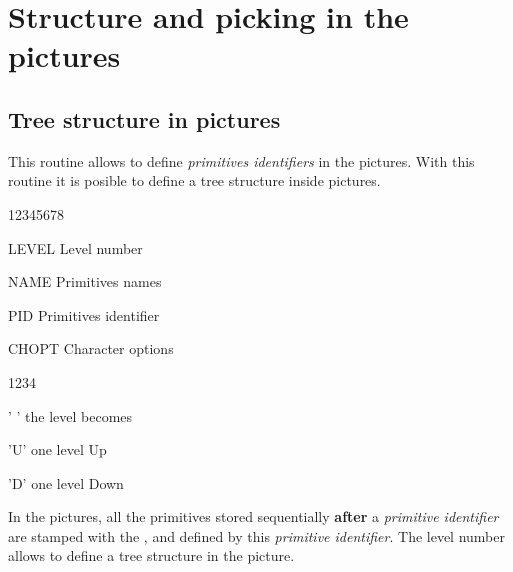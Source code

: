 \chapter{Structure and picking in the \HIGZ{} pictures}
\section{Tree structure in \HIGZ{} pictures}
\Action
This routine allows to define {\it primitives identifiers} in the 
\HIGZ{} pictures. With this routine it is posible to define a tree 
structure inside \HIGZ{} pictures.
\Pdesc
\begin{DLtt}{12345678}
   \item[LEVEL] Level number
   \item[NAME] Primitives names
   \item[PID] Primitives identifier
   \item[CHOPT] Character options
   \begin{DLtt}{1234}
      \item[' '] the level becomes 
      \item['U'] one level Up
      \item['D'] one level Down
   \end{DLtt}
\end{DLtt}
\par
In the \HIGZ{} pictures, all the primitives stored sequentially {\bf after} a
{\it primitive identifier\/} are stamped with the , 
 and 
defined by this {\it primitive identifier\/}. The level number allows 
to define a tree structure in the \HIGZ{} picture.

